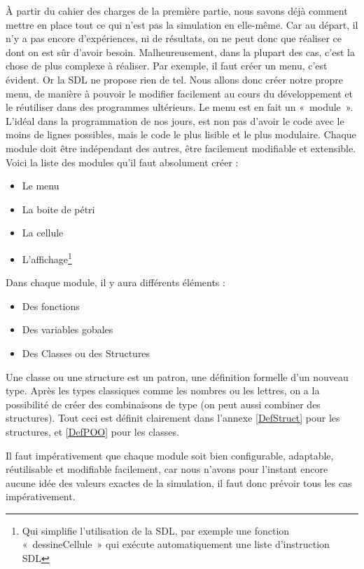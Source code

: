 À partir du cahier des charges de la première partie, nous savons déjà comment mettre en place tout ce qui 
  n'est pas la simulation en elle-même. Car au départ, il n'y a pas encore d'expériences, ni de résultats, on ne peut donc que réaliser ce dont on est sûr d'avoir besoin. Malheureusement, dans la plupart des cas, c'est la chose de plus complexe à réaliser.
  Par exemple, il faut créer un menu, c'est évident. Or la SDL ne propose rien de tel. Nous allons donc créer notre propre menu, de manière à pouvoir le modifier facilement au cours du développement et le réutiliser dans des programmes ultérieurs. Le menu est en fait un «~module~». L'idéal dans la programmation de nos jours, est non pas d'avoir le code avec le moins de lignes possibles, mais le code le plus lisible et le plus modulaire. Chaque module doit être indépendant des autres, être facilement modifiable et extensible.
  Voici la liste des modules qu'il faut absolument créer : 
  \begin{itemize}
    \item Le menu
    \item La boite de pétri
    \item La cellule
    \item L'affichage\footnote{Qui simplifie l'utilisation de la SDL, par exemple une fonction «~dessineCellule~» qui exécute automatiquement une liste d'instruction SDL}
  \end{itemize}
  
  Dans chaque module, il y aura différents éléments : 
    \begin{itemize}
      \item Des fonctions
      \item Des variables gobales
      \item Des Classes ou des Structures
    \end{itemize}
  Une classe ou une structure est un patron, une définition formelle d'un nouveau type.
  Après les types classiques comme les nombres ou les lettres, on a la possibilité de créer
  des combinaisons de type (on peut aussi combiner des structures). Tout ceci est définit 
  clairement dans l'annexe \ref{DefStruct} pour les structures, et \ref{DefPOO} pour les
  classes.
  
  Il faut impérativement que chaque module soit bien configurable, adaptable, réutilisable et modifiable facilement, car nous n'avons pour l'instant encore aucune idée des valeurs exactes de la simulation, il faut donc prévoir tous les cas impérativement.

